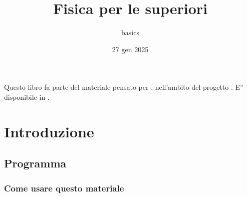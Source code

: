 \documentclass[letterpaper,10pt,italian]{jupyterBook}
\title{Fisica per le superiori}
\date{27 gen 2025}
\author{basics}
\begin{document}
\pagestyle{empty}
\sphinxmaketitle
\pagestyle{plain}
\sphinxtableofcontents
\pagestyle{normal}
\label{\detokenize{intro::doc}}


\sphinxAtStartPar
Questo libro fa parte del materiale pensato per , nell’ambito del progetto . E” disponibile in .





\sphinxstepscope


\part{Introduzione}

\sphinxstepscope


\chapter{Programma}
\label{\detokenize{ch/program:programma}}\label{\detokenize{ch/program:physics-hs-program}}\label{\detokenize{ch/program::doc}}

\section{Come usare questo materiale}
\label{\detokenize{ch/program:come-usare-questo-materiale}}
\end{document}
